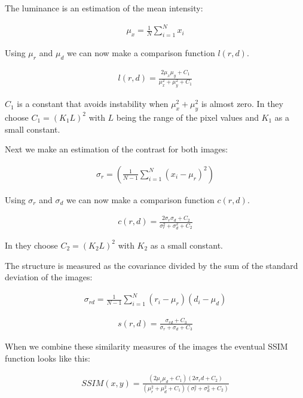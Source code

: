 The luminance is an estimation of the mean intensity:

\begin{align}
    \mu_x = \frac{1}{N}\sum_{i=1}^{N}{x_i}
\end{align}

Using $\mu_r$ and $\mu_d$ we can now make a comparison function $l(r, d)$.

\begin{align}
    l(r, d) = \frac{ 2\mu_x\mu_y + C_1 }{ \mu_x^2 + \mu_y^2 + C_1}
\end{align}

$C_1$ is a constant that avoids instability when $\mu_x^2 + \mu_y^2$ is almost zero. In \cite{wang_image_2004} they choose $C_1 = ( K_1 L )^2$ with $L$ being the range of the pixel values and $K_1$ as a small constant.

Next we make an estimation of the contrast for both images:

\begin{align}
    \sigma_r = \left( \frac{1}{N - 1} \sum_{i=1}^{N}{\left( x_i - \mu_r \right)^2} \right)
\end{align}

Using $\sigma_r$ and $\sigma_d$ we can now make a comparison function $c(r, d)$.

\begin{align}
    c(r, d) = \frac{ 2\sigma_r\sigma_d + C_2 }{ \sigma_r^2 + \sigma_d^2 + C_2}
\end{align}

In \cite{wang_image_2004} they choose $C_2 = ( K_2 L )^2$ with $K_2$ as a small constant.

The structure is measured as the covariance divided by the sum of the standard deviation of the images:

\begin{align}
    \sigma_{rd} = \frac{ 1 }{ N - 1 } \sum^N_{i=1}{(r_i - \mu_r)(d_i - \mu_d)} 
\end{align}

\begin{align}
    s(r, d) = \frac{ \sigma_{rd} + C_3 }{ \sigma_r + \sigma_d + C_3}
\end{align}

When we combine these similarity measures of the images the eventual SSIM function looks like this:

\begin{align}
    SSIM(x, y) = \frac{(2\mu_r\mu_d + C_1)(2\sigma_rd + C_2)}{(\mu^2_r + \mu^2_d + C_1)(\sigma^2_r + \sigma^2_d + C_2)}
\end{align}

